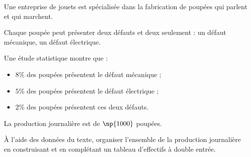 \begin{exo}
	Une entreprise de jouets est spécialisée dans la fabrication de poupées qui parlent et qui marchent.

	Chaque poupée peut présenter deux défauts et deux seulement : un défaut mécanique, un défaut électrique.

	Une étude statistique montre que :
	\begin{itemize}
		\item $8$\% des poupées présentent le défaut mécanique ;
		\item $5$\% des poupées présentent le défaut électrique ;
		\item $2$\% des poupées présentent ces deux défauts.
	\end{itemize}

	La production journalière est de $\np{1000}$ poupées.

	À l'aide des données du texte, organiser l'ensemble de la production journalière en construisant et en complétant un tableau d'effectifs à double entrée.
\end{exo}
